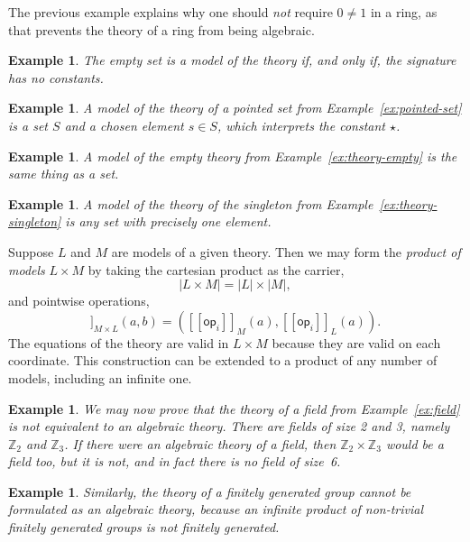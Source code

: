 \documentclass{amsart}
\newcommand{\ZZ}{\mathbb{Z}}
\newcommand{\op}{\mathsf{op}}
\newcommand{\sem}[1]{[\![#1]\!]}
\newtheorem{example}[definition]{Example}
\begin{document}
The previous example explains why one should \emph{not} require $0 \neq 1$ in a ring, as
that prevents the theory of a ring from being algebraic.

\begin{example}
  The empty set is a model of the theory if, and only if, the signature has no constants.
\end{example}

\begin{example}
  A model of the theory of a pointed set from Example~\ref{ex:pointed-set} is a set $S$
  and a chosen element $s \in S$, which interprets the constant $\star$.
\end{example}

\begin{example}
  A model of the empty theory from Example~\ref{ex:theory-empty} is the same thing as a
  set.
\end{example}

\begin{example}
  A model of the theory of the singleton from Example~\ref{ex:theory-singleton} is any
  set with precisely one element.
\end{example}

Suppose $L$ and $M$ are models of a given theory. Then we may form the \emph{product of
  models} $L \times M$ by taking the cartesian product as the carrier,
%
\begin{equation*}
  |L \times M| = |L| \times |M|,
\end{equation*}
%
and pointwise operations,
%
\begin{equation*}
  \sem{\op_i}_{M \times L}(a, b) = (\sem{\op_i}_M(a), \sem{\op_i}_L(a)).
\end{equation*}
%
The equations of the theory are valid in $L \times M$ because they are valid on each
coordinate. This construction can be extended to a product of any number of models,
including an infinite one.

\begin{example}
  We may now prove that the theory of a field from Example~\ref{ex:field} is not
  equivalent to an algebraic theory. There are fields of size 2 and 3, namely $\ZZ_2$ and
  $\ZZ_3$. If there were an algebraic theory of a field, then $\ZZ_2 \times \ZZ_3$ would
  be a field too, but it is not, and in fact there is no field of size~6.
\end{example}

\begin{example}
  Similarly, the theory of a finitely generated group cannot be formulated as an algebraic
  theory, because an infinite product of non-trivial finitely generated groups is not
  finitely generated.
\end{example}
\end{document}
